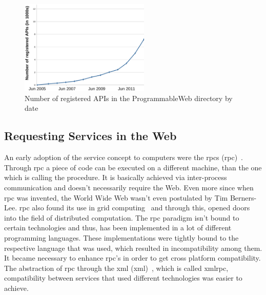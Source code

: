 \begin{figure}[!ht]
  \centering
  \includegraphics[width=0.55\textwidth]{figures/NumOfAPIs}
  \caption{Number of registered APIs in the ProgrammableWeb directory by date}
  \label{fig:NumOfAPIs}
\end{figure}


\subsection{Requesting Services in the Web}
An early adoption of the service concept to computers were the \textrm{\acrlong{rpc}}s (\acrshort{rpc})~\cite{Birrell:1984:IRP:2080.357392}.
Through \textrm{\acrshort{rpc}} a piece of code can be executed on a different machine, than the one which is calling the procedure.
It is basically achieved via inter-process communication and doesn't necessarily require the Web.
Even more since when \textrm{\acrshort{rpc}} was invented, the \textrm{World Wide Web} wasn't even postulated by Tim Berners-Lee. 
\textrm{\acrshort{rpc}} also found its use in grid computing~\cite{seymour2002overview} and through this, opened doors into the field of distributed computation.
The \textrm{\acrshort{rpc}} paradigm isn't bound to certain technologies and thus, has been implemented in a lot of different programming languages.
These implementations were tightly bound to the respective language that was used, which resulted in incompatibility among them.
It became necessary to enhance \textrm{\acrshort{rpc}}'s in order to get cross platform compatibility.
The abstraction of \textrm{\acrshort{rpc}} through the \textrm{\acrlong{xml}} (\textrm{\acrshort{xml}})~\cite{bray1998extensible}, which is called \textrm{\acrshort{xmlrpc}}, compatibility between services that used different technologies was easier to achieve.

